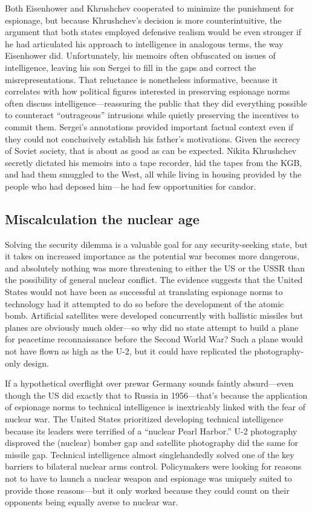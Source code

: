 \documentclass[11pt]{memoir}
\begin{document}
Both Eisenhower and Khrushchev cooperated to minimize the punishment for espionage, but because Khrushchev's decision is more counterintuitive, the argument that both states employed defensive realism would be even stronger if he had articulated his approach to intelligence in analogous terms, the way Eisenhower did. Unfortunately, his memoirs often obfuscated on issues of intelligence, leaving his son Sergei to fill in the gaps and correct the misrepresentations. That reluctance is nonetheless informative, because it correlates with how political figures interested in preserving espionage norms often discuss intelligence---reassuring the public that they did everything possible to counteract ``outrageous'' intrusions while quietly preserving the incentives to commit them. Sergei's annotations provided important factual context even if they could not conclusively establish his father's motivations. Given the secrecy of Soviet society, that is about as good as can be expected. Nikita Khrushchev secretly dictated his memoirs into a tape recorder, hid the tapes from the KGB, and had them smuggled to the West, all while living in housing provided by the people who had deposed him---he had few opportunities for candor.

\subsection{Miscalculation the nuclear age}
Solving the security dilemma is a valuable goal for any security-seeking state, but it takes on increased importance as the potential war becomes more dangerous, and absolutely nothing was more threatening to either the US or the USSR than the possibility of general nuclear conflict. The evidence suggests that the United States would not have been as successful at translating espionage norms to technology had it attempted to do so before the development of the atomic bomb. Artificial satellites were developed concurrently with ballistic missiles but planes are obviously much older---so why did no state attempt to build a plane for peacetime reconnaissance before the Second World War? Such a plane would not have flown as high as the U-2, but it could have replicated the photography-only design.


If a hypothetical overflight over prewar Germany sounds faintly absurd---even though the US did exactly that to Russia in 1956---that's because the application of espionage norms to technical intelligence is inextricably linked with the fear of nuclear war. The United States prioritized developing technical intelligence because its leaders were terrified of a ``nuclear Pearl Harbor.'' U-2 photography disproved the (nuclear) bomber gap and satellite photography did the same for missile gap. Technical intelligence almost singlehandedly solved one of the key barriers to bilateral nuclear arms control. Policymakers were looking for reasons not to have to launch a nuclear weapon and espionage was uniquely suited to provide those reasons---but it only worked because they could count on their opponents being equally averse to nuclear war.
\end{document}
